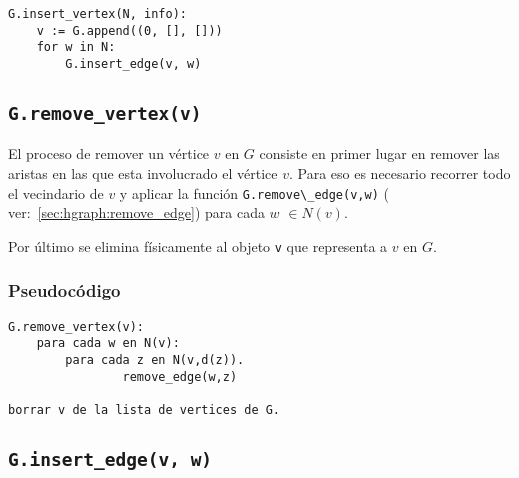 \documentclass[%
    a4paper,%
    12pt,%
    twoside,%
    openright,%
    halfparskip,%
    cleardoubleempty,%
    bigheadings,%
    titlepage,%
    headsepline%
]{scrbook}
\makeatletter
\newcommand{\Code}[1]{\lstinline[basicstyle={\tt}]@#1@}
\makeatother
\begin{document}
\begin{lstlisting}[float=h]
G.insert_vertex(N, info):
    v := G.append((0, [], []))
    for w in N:
        G.insert_edge(v, w)
\end{lstlisting}

\subsection{\texttt{G.remove\_vertex(v)}}
\label{sec:hgraph:remove_vertex}

El proceso de remover un vértice $v$ en $G$ consiste en primer lugar en remover las aristas en las que esta involucrado el vértice $v$. Para eso es necesario recorrer todo el vecindario de $v$ y aplicar la función \Code{G.remove\_edge(v,w)} ( ver:~\ref{sec:hgraph:remove_edge}) para cada $w$ $\in N(v)$.

Por último se elimina físicamente al objeto \texttt{v} que representa a $v$ en $G$.

\subsubsection*{Pseudocódigo}

\begin{lstlisting}[float=h]
G.remove_vertex(v):
    para cada w en N(v):
        para cada z en N(v,d(z)).
                remove_edge(w,z)
            
borrar v de la lista de vertices de G.
\end{lstlisting}



\subsection{\texttt{G.insert\_edge(v, w)}}
\label{sec:hgraph:insert_edge}
\end{document}
